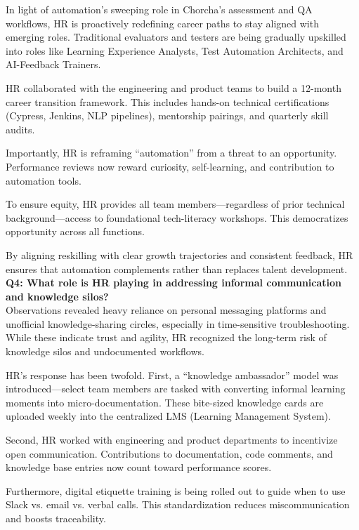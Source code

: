 \documentclass[12pt,a4paper,oneside]{book}
\begin{document}
In light of automation's sweeping role in Chorcha’s assessment and QA workflows, HR is proactively redefining career paths to stay aligned with emerging roles. Traditional evaluators and testers are being gradually upskilled into roles like Learning Experience Analysts, Test Automation Architects, and AI-Feedback Trainers.

HR collaborated with the engineering and product teams to build a 12-month career transition framework. This includes hands-on technical certifications (Cypress, Jenkins, NLP pipelines), mentorship pairings, and quarterly skill audits.

Importantly, HR is reframing “automation” from a threat to an opportunity. Performance reviews now reward curiosity, self-learning, and contribution to automation tools.

To ensure equity, HR provides all team members—regardless of prior technical background—access to foundational tech-literacy workshops. This democratizes opportunity across all functions.

By aligning reskilling with clear growth trajectories and consistent feedback, HR ensures that automation complements rather than replaces talent development.\\



\textbf{Q4: What role is HR playing in addressing informal communication and knowledge silos?} \\

Observations revealed heavy reliance on personal messaging platforms and unofficial knowledge-sharing circles, especially in time-sensitive troubleshooting. While these indicate trust and agility, HR recognized the long-term risk of knowledge silos and undocumented workflows.

HR’s response has been twofold. First, a “knowledge ambassador” model was introduced—select team members are tasked with converting informal learning moments into micro-documentation. These bite-sized knowledge cards are uploaded weekly into the centralized LMS (Learning Management System).

Second, HR worked with engineering and product departments to incentivize open communication. Contributions to documentation, code comments, and knowledge base entries now count toward performance scores.

Furthermore, digital etiquette training is being rolled out to guide when to use Slack vs. email vs. verbal calls. This standardization reduces miscommunication and boosts traceability.
\end{document}
